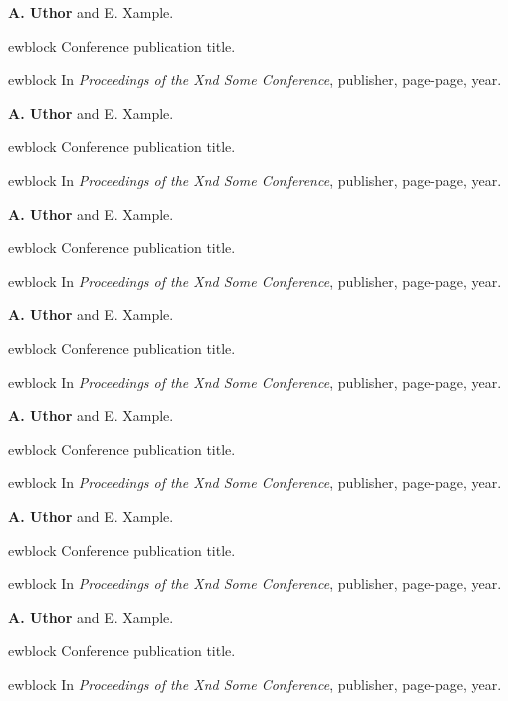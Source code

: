 \documentclass[12pt,a4paper]{extarticle}
\begin{document}
\begin{enumerate}[wide = 0pt, widest = {[4]}, leftmargin =*]

\item[{[3]}] \textbf{A. Uthor} and E. Xample.

ewblock {Conference publication title}.

ewblock In \emph{Proceedings of the Xnd Some Conference}, publisher, page-page, year.
\vspace*{1em}
\item[{[4]}] \textbf{A. Uthor} and E. Xample.

ewblock {Conference publication title}.

ewblock In \emph{Proceedings of the Xnd Some Conference}, publisher, page-page, year.
\vspace*{1em}
\item[{[5]}] \textbf{A. Uthor} and E. Xample.

ewblock {Conference publication title}.

ewblock In \emph{Proceedings of the Xnd Some Conference}, publisher, page-page, year.
\vspace*{1em}
\item[{[6]}] \textbf{A. Uthor} and E. Xample.

ewblock {Conference publication title}.

ewblock In \emph{Proceedings of the Xnd Some Conference}, publisher, page-page, year.
\vspace*{1em}
\item[{[7]}] \textbf{A. Uthor} and E. Xample.

ewblock {Conference publication title}.

ewblock In \emph{Proceedings of the Xnd Some Conference}, publisher, page-page, year.
\vspace*{1em}
\item[{[8]}] \textbf{A. Uthor} and E. Xample.

ewblock {Conference publication title}.

ewblock In \emph{Proceedings of the Xnd Some Conference}, publisher, page-page, year.
\vspace*{1em}
\item[{[9]}] \textbf{A. Uthor} and E. Xample.

ewblock {Conference publication title}.

ewblock In \emph{Proceedings of the Xnd Some Conference}, publisher, page-page, year.
\end{enumerate}
\end{document}
